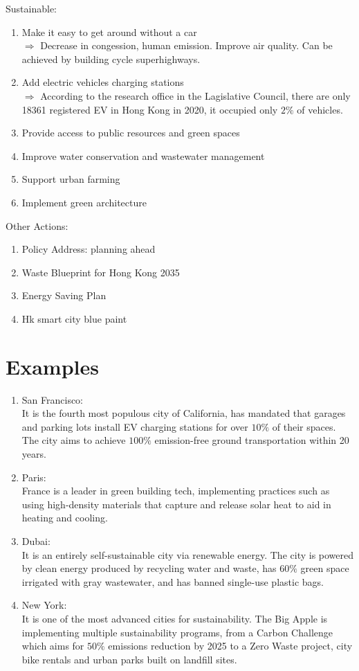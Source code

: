 \documentclass[11pt]{article}
\begin{document}
\raggedright Sustainable:
\begin{enumerate}
    \item Make it easy to get around without a car\\
        $\Longrightarrow$ Decrease in congession, human emission. Improve air quality. Can be achieved by building cycle superhighways.
    \item Add electric vehicles charging stations\\
        $\Longrightarrow$ According to the research office in the Lagislative Council, there are only 18361 registered EV in Hong Kong in 2020, it occupied only $2\%$ of vehicles. 
    \item Provide access to public resources and green spaces
    \item Improve water conservation and wastewater management
    \item Support urban farming
    \item Implement green architecture
\end{enumerate}

Other Actions:
\begin{enumerate}
\item Policy Address: planning ahead 
\item Waste Blueprint for Hong Kong 2035 
\item Energy Saving Plan
\item Hk smart city blue paint
\end{enumerate}


\section{Examples}
\begin{enumerate}
    \item San Francisco:\\
    It is the fourth most populous city of California, has mandated that garages and parking lots install EV charging stations for over $10\%$ of their spaces. The city aims to achieve $100\%$ emission-free ground transportation within 20 years.
    \item Paris:\\
    France is a leader in green building tech, implementing practices such as using high-density materials that capture and release solar heat to aid in heating and cooling.
    \item Dubai:\\
    It is an entirely self-sustainable city via renewable energy. The city is powered by clean energy produced by recycling water and waste, has $60\%$ green space irrigated with gray wastewater, and has banned single-use plastic bags.
    \item New York:\\
    It is one of the most advanced cities for sustainability. The Big Apple is implementing multiple sustainability programs, from a Carbon Challenge which aims for $50\%$ emissions reduction by 2025 to a Zero Waste project, city bike rentals and urban parks built on landfill sites.

\end{enumerate}
\end{document}
